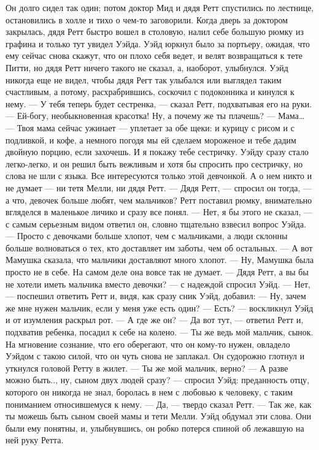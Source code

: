 Он долго сидел так один; потом доктор Мид и дядя Ретт спустились по лестнице, остановились в холле и тихо о чем-то заговорили. Когда дверь за доктором закрылась, дядя Ретт быстро вошел в столовую, налил себе большую рюмку из графина и только тут увидел Уэйда. Уэйд юркнул было за портьеру, ожидая, что ему сейчас снова скажут, что он плохо себя ведет, и велят возвращаться к тете Питти, но дядя Ретт ничего такого не сказал, а, наоборот, улыбнулся. Уэйд никогда еще не видел, чтобы дядя Регт так улыбался или выглядел таким счастливым, а потому, расхрабрившись, соскочил с подоконника и кинулся к нему.
— У тебя теперь будет сестренка, — сказал Ретт, подхватывая его на руки. — Ей-богу, необыкновенная красотка! Ну, а почему же ты плачешь?
— Мама…
— Твоя мама сейчас ужинает — уплетает за обе щеки: и курицу с рисом и с подливкой, и кофе, а немного погодя мы ей сделаем мороженое и тебе дадим двойную порцию, если захочешь. И я покажу тебе сестричку.
Уэйду сразу стало легко-легко, и он решил быть вежливым и хотя бы спросить про сестричку, но слова не шли с языка. Все интересуются только этой девчонкой. А о нем никто и не думает — ни тетя Мелли, ни дядя Ретт.
— Дядя Ретт, — спросил он тогда, — а что, девочек больше любят, чем мальчиков?
Ретт поставил рюмку, внимательно вгляделся в маленькое личико и сразу все понял.
— Нет, я бы этого не сказал, — с самым серьезным видом ответил он, словно тщательно взвесил вопрос Уэйда. — Просто с девочками больше хлопот, чем с мальчиками, а люди склонны больше волноваться о тех, кто доставляет им заботы, чем об остальных.
— А вот Мамушка сказала, что мальчики доставляют много хлопот.
— Ну, Мамушка была просто не в себе. На самом деле она вовсе так не думает.
— Дядя Ретт, а вы бы не хотели иметь мальчика вместо девочки? — с надеждой спросил Уэйд.
— Нет, — поспешил ответить Ретт и, видя, как сразу сник Уэйд, добавил: — Ну, зачем же мне нужен мальчик, если у меня уже есть один?
— Есть? — воскликнул Уэйд и от изумления раскрыл рот. — А где же он?
— Да вот тут, — ответил Ретт и, подхватив ребенка, посадил к себе на колено. — Ты же ведь мой мальчик, сынок.
На мгновение сознание, что его оберегают, что он кому-то нужен, овладело Уэйдом с такою силой, что он чуть снова не заплакал. Он судорожно глотнул и уткнулся головой Ретту в жилет.
— Ты же мой мальчик, верно?
— А разве можно быть.., ну, сыном двух людей сразу? — спросил Уэйд: преданность отцу, которого он никогда не знал, боролась в нем с любовью к человеку, с таким пониманием относившемуся к нему.
— Да, — твердо сказал Ретт. — Так же, как ты можешь быть сыном своей мамы и тети Мелли.
Уэйд обдумал эти слова. Они были ему понятны, и, улыбнувшись, он робко потерся спиной об лежавшую на ней руку Ретта.
